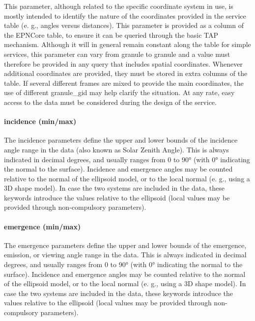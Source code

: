 \documentclass[11pt,a4paper]{ivoa}
\begin{document}
This parameter, although related to the specific coordinate system in use, is mostly intended to identify the nature of the coordinates provided in the service table (e. g., angles versus distances). This parameter is provided as a column of the EPNCore table, to ensure it can be queried through the basic TAP mechanism. Although it will in general remain constant along the table for simple services, this parameter can vary from granule to granule and a value must therefore be provided in any query that includes spatial coordinates. Whenever additional coordinates are provided, they must be stored in extra columns of the table. If several different frames are mixed to provide the main coordinates, the use of different granule\_gid may help clarify the situation. At any rate, easy access to the data must be considered during the design of the service. 

\paragraph{incidence (min/max)}

The incidence parameters define the upper and lower bounds of the incidence angle range in the data (also known as Solar Zenith Angle). This is always indicated in decimal degrees, and usually ranges from 0 to 90° (with 0° indicating the normal to the surface). Incidence and emergence angles may be counted relative to the normal of the ellipsoid model, or to the local normal (e. g., using a 3D shape model). In case the two systems are included in the data, these keywords introduce the values relative to the ellipsoid (local values may be provided through non-compulsory parameters).

\paragraph{emergence (min/max)}

The emergence parameters define the upper and lower bounds of the emergence, emission, or viewing angle range in the data. This is always indicated in decimal degrees, and usually ranges from 0 to 90° (with 0° indicating the normal to the surface). Incidence and emergence angles may be counted relative to the normal of the ellipsoid model, or to the local normal (e. g., using a 3D shape model). In case the two systems are included in the data, these keywords introduce the values relative to the ellipsoid (local values may be provided through non-compulsory parameters).
\end{document}
